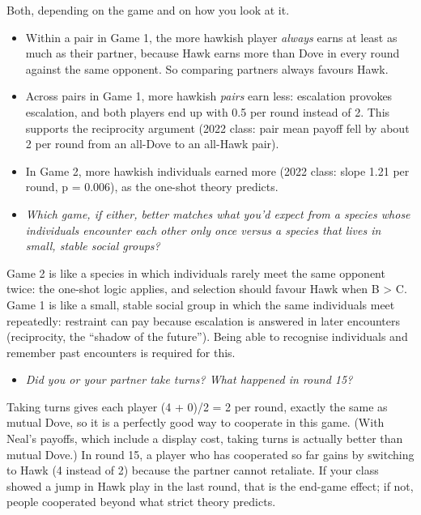 \documentclass[
  a4paper]{book}
\providecommand{\tightlist}{%
  \setlength{\itemsep}{0pt}\setlength{\parskip}{0pt}}
\begin{document}
Both, depending on the game and on how you look at it.

\begin{itemize}
\item
  Within a pair in Game 1, the more hawkish player \emph{always} earns at least as much as their partner, because Hawk earns more than Dove in every round against the same opponent. So comparing partners always favours Hawk.
\item
  Across pairs in Game 1, more hawkish \emph{pairs} earn less: escalation provokes escalation, and both players end up with 0.5 per round instead of 2. This supports the reciprocity argument (2022 class: pair mean payoff fell by about 2 per round from an all-Dove to an all-Hawk pair).
\item
  In Game 2, more hawkish individuals earned more (2022 class: slope 1.21 per round, p = 0.006), as the one-shot theory predicts.
\item
  \emph{Which game, if either, better matches what you'd expect from a species whose individuals encounter each other only once versus a species that lives in small, stable social groups?}
\end{itemize}

Game 2 is like a species in which individuals rarely meet the same opponent twice: the one-shot logic applies, and selection should favour Hawk when B \textgreater{} C. Game 1 is like a small, stable social group in which the same individuals meet repeatedly: restraint can pay because escalation is answered in later encounters (reciprocity, the ``shadow of the future''). Being able to recognise individuals and remember past encounters is required for this.

\begin{itemize}
\tightlist
\item
  \emph{Did you or your partner take turns? What happened in round 15?}
\end{itemize}

Taking turns gives each player (4 + 0)/2 = 2 per round, exactly the same as mutual Dove, so it is a perfectly good way to cooperate in this game. (With Neal's payoffs, which include a display cost, taking turns is actually better than mutual Dove.) In round 15, a player who has cooperated so far gains by switching to Hawk (4 instead of 2) because the partner cannot retaliate. If your class showed a jump in Hawk play in the last round, that is the end-game effect; if not, people cooperated beyond what strict theory predicts.
\end{document}

